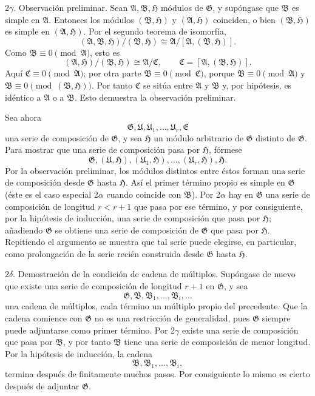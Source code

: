 \documentclass[11pt]{article}
\providecommand{\mA}{\mathfrak{A}}
\providecommand{\mB}{\mathfrak{B}}
\providecommand{\mC}{\mathfrak{C}}
\providecommand{\mE}{\mathfrak{E}}
\providecommand{\mG}{\mathfrak{G}}
\providecommand{\mH}{\mathfrak{H}}
\providecommand{\mU}{\mathfrak{U}}
\begin{document}
2$\gamma$. Observación preliminar. Sean $\mA,\mB,\mH$ módulos de $\mG$, y supóngase que $\mB$ es simple en $\mA$. Entonces los módulos $(\mB,\mH)$ y $(\mA,\mH)$ coinciden, o bien $(\mB,\mH)$ es simple en $(\mA,\mH)$. Por el segundo teorema de isomorfía,
\[
        (\mA,\mB,\mH)/(\mB,\mH)
        \cong
        \mA/[\mA,(\mB,\mH)].
\]
Como $\mB\equiv0\pmod{\mA}$, esto es
\[
        (\mA,\mH)/(\mB,\mH)\cong \mA/\mC,
        \qquad \mC=[\mA,(\mB,\mH)].
\]
Aquí $\mC\equiv0\pmod{\mA}$; por otra parte $\mB\equiv0\pmod{\mC}$, porque $\mB\equiv0\pmod{\mA}$ y $\mB\equiv0\pmod{(\mB,\mH)}$. Por tanto $\mC$ se sitúa entre $\mA$ y $\mB$ y, por hipótesis, es idéntico a $\mA$ o a $\mB$. Esto demuestra la observación preliminar.

Sea ahora
\[
        \mG,\mU,\mU_1,\ldots,\mU_r,\mE
\]
una serie de composición de $\mG$, y sea $\mH$ un módulo arbitrario de $\mG$ distinto de $\mG$. Para mostrar que una serie de composición pasa por $\mH$, fórmese
\[
        \mG,(\mU,\mH),(\mU_1,\mH),\ldots,(\mU_r,\mH),\mH.
\]
Por la observación preliminar, los módulos distintos entre éstos forman una serie de composición desde $\mG$ hasta $\mH$. Así el primer término propio es simple en $\mG$ (éste es el caso especial 2$\alpha$ cuando coincide con $\mB$). Por 2$\alpha$ hay en $\mG$ una serie de composición de longitud $r<r+1$ que pasa por ese término, y por consiguiente, por la hipótesis de inducción, una serie de composición que pasa por $\mH$; añadiendo $\mG$ se obtiene una serie de composición de $\mG$ que pasa por $\mH$. Repitiendo el argumento se muestra que tal serie puede elegirse, en particular, como prolongación de la serie recién construida desde $\mG$ hasta $\mH$.

2$\delta$. Demostración de la condición de cadena de múltiplos. Supóngase de nuevo que existe una serie de composición de longitud $r+1$ en $\mG$, y sea
\[
        \mG,\mB,\mB_1,\ldots,\mB_i,\ldots
\]
una cadena de múltiplos, cada término un múltiplo propio del precedente. Que la cadena comience con $\mG$ no es una restricción de generalidad, pues $\mG$ siempre puede adjuntarse como primer término. Por 2$\gamma$ existe una serie de composición que pasa por $\mB$, y por tanto $\mB$ tiene una serie de composición de menor longitud. Por la hipótesis de inducción, la cadena
\[
        \mB,\mB_1,\ldots,\mB_i,
\]
termina después de finitamente muchos pasos. Por consiguiente lo mismo es cierto después de adjuntar $\mG$.
\end{document}
